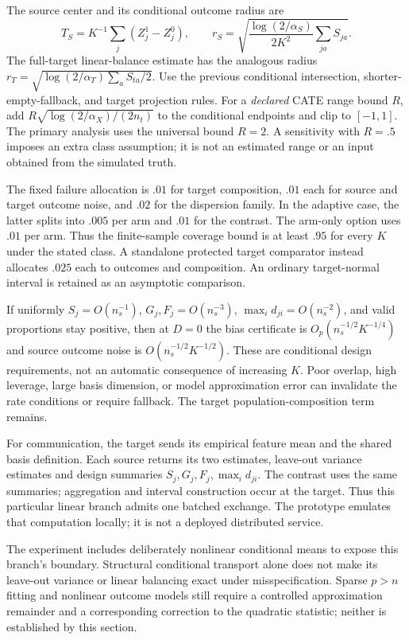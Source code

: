 The source center and its conditional outcome radius are
\[
 T_S=K^{-1}\sum_j(Z_j^1-Z_j^0),\qquad
 r_S=\sqrt{\frac{\log(2/\alpha_S)}{2K^2}\sum_{ja}S_{ja}}.
\]
The full-target linear-balance estimate has the analogous radius
$r_T=\sqrt{\log(2/\alpha_T)\sum_aS_{ta}/2}$.
Use the previous conditional intersection, shorter-empty-fallback, and target
projection rules. For a \emph{declared} CATE range bound $R$, add
$R\sqrt{\log(2/\alpha_X)/(2n_t)}$ to the conditional endpoints and clip to
$[-1,1]$. The primary analysis uses the universal bound $R=2$. A sensitivity
with $R=.5$ imposes an extra class assumption; it is not an estimated range or
an input obtained from the simulated truth.

The fixed failure allocation is $.01$ for target composition, $.01$ each for
source and target outcome noise, and $.02$ for the dispersion family. In the
adaptive case, the latter splits into $.005$ per arm and $.01$ for the contrast.
The arm-only option uses $.01$ per arm. Thus the finite-sample coverage bound
is at least $.95$ for every $K$ under the stated class. A standalone protected
target comparator instead allocates $.025$ each to outcomes and composition.
An ordinary target-normal interval is retained as an asymptotic comparison.

If uniformly $S_j=O(n_s^{-1})$, $G_j,F_j=O(n_s^{-3})$,
$\max_i d_{ji}=O(n_s^{-2})$, and valid proportions stay positive, then at
$D=0$ the bias certificate is $O_p(n_s^{-1/2}K^{-1/4})$ and source outcome
noise is $O(n_s^{-1/2}K^{-1/2})$. These are conditional design requirements,
not an automatic consequence of increasing $K$. Poor overlap, high leverage,
large basis dimension, or model approximation error can invalidate the rate
conditions or require fallback. The target population-composition term remains.

For communication, the target sends its empirical feature mean and the shared
basis definition. Each source returns its two estimates, leave-out variance
estimates and design summaries $S_j,G_j,F_j,\max_i d_{ji}$. The contrast uses
the same summaries; aggregation and interval construction occur at the target.
Thus this particular linear branch admits one batched exchange. The prototype
emulates that computation locally; it is not a deployed distributed service.

The experiment includes deliberately nonlinear conditional means to expose
this branch's boundary. Structural conditional transport alone does not make
its leave-out variance or linear balancing exact under misspecification.
Sparse $p>n$ fitting and nonlinear outcome models still require a controlled
approximation remainder and a corresponding correction to the quadratic
statistic; neither is established by this section.
